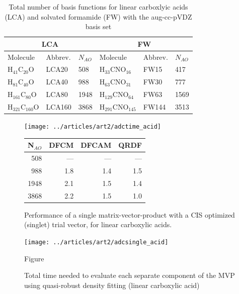 \begin{table}
\begin{tabular}{llllll}
\hline
\multicolumn{3}{c}{LCA} & \multicolumn{3}{c}{FW} \\ \hline
Molecule & Abbrev. & $N_{AO}$ & Molecule & Abbrev. & $N_{AO}$ \\ \hline
H$_{41}$C$_{20}$O & LCA20 & 508 & H$_{33}$CNO$_{16}$ & FW15 & 417 \\
H$_{81}$C$_{40}$O & LCA40 & 988 & H$_{63}$CNO$_{31}$ & FW30 & 777 \\
H$_{161}$C$_{80}$O & LCA80 & 1948 & H$_{129}$CNO$_{64}$ & FW63 & 1569 \\
H$_{321}$C$_{160}$O & LCA160 & 3868 & H$_{291}$CNO$_{145}$ & FW144 & 3513  
\end{tabular}
\label{tab:ES_NUMBAS}
\caption{Total number of basis functions for linear carboxlyic acids (LCA) and solvated formamide (FW) with the aug-cc-pVDZ basis set}
\end{table}

\begin{figure}
\begin{minipage}{0.5\textwidth}
\centering
\texttt{[image: ../articles/art2/adctime\_acid]}
\end{minipage}
\begin{minipage}{0.4\textwidth}
\centering
\begin{tabular}{rrrr}
\hline
N$_{AO}$ & DFCM & DFCAM & QRDF \\ \hline
508 & --- & --- & --- \\ 
988 & 1.8 & 1.4 & 1.5 \\ 
1948 & 2.1 & 1.5 & 1.4 \\ 
3868 & 2.2 & 1.5 & 1.0 \\
 \hline
\end{tabular}
\end{minipage}
\caption{Performance of a single matrix-vector-product with a CIS optimized (singlet) trial vector, for linear carboxylic acids.}
\label{fig:ES_TIME_LCA}
\end{figure}

\begin{figure}
\centering
\texttt{[image: ../articles/art2/adcsingle\_acid]}
\caption{Figure}
\caption{Total time needed to evaluate each separate component of the MVP using quasi-robust density fitting (linear carboxylic acid)}
\label{fig:ES_TIMESINGLE_LCA}
\end{figure}

